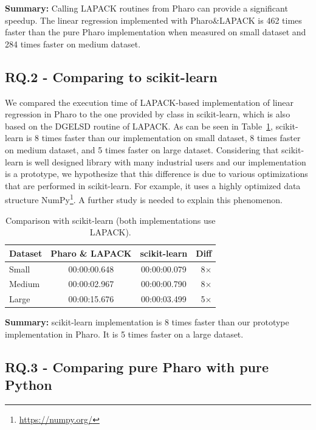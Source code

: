 \documentclass[]{ceurart}
\begin{document}
\begin{cbox}
\textbf{Summary:} Calling LAPACK routines from Pharo can provide a significant speedup. The linear regression implemented with Pharo\&LAPACK is 462 times faster than the pure Pharo implementation when measured on small dataset and 284 times faster on medium dataset.
\end{cbox}

\subsection*{RQ.2 - Comparing to scikit-learn}

We compared the execution time of LAPACK-based implementation of linear regression in Pharo to the one provided by  class in scikit-learn, which is also based on the DGELSD routine of LAPACK.
As can be seen in Table~\ref{tab:CompareScikit}, scikit-learn is 8 times faster than our implementation on small dataset, 8 times faster on medium dataset, and 5 times faster on large dataset.
Considering that scikit-learn is well designed library with many industrial users and our implementation is a prototype, we hypothesize that this difference is due to various optimizations that are performed in scikit-learn.
For example, it uses a highly optimized data structure NumPy\footnote{\url{https://numpy.org/}}.
A further study is needed to explain this phenomenon.

\begin{table}[htbp]
\centering
\caption{Comparison with scikit-learn (both implementations use LAPACK).}
\begin{tabular}{l|cc|r}
\hline
\textbf{Dataset} & \textbf{Pharo \& LAPACK} & \textbf{scikit-learn} & \textbf{Diff} \\
\hline
Small & 00:00:00.648 & 00:00:00.079 & 8$\times$ \\
Medium & 00:00:02.967 & 00:00:00.790 & 8$\times$ \\
Large & 00:00:15.676 & 00:00:03.499 & 5$\times$ \\
\hline
\end{tabular}
\label{tab:CompareScikit}
\end{table}

\begin{cbox}
\textbf{Summary:} scikit-learn implementation is 8 times faster than our prototype implementation in Pharo. It is 5 times faster on a large dataset.
\end{cbox}

\subsection*{RQ.3 - Comparing pure Pharo with pure Python}
\end{document}
